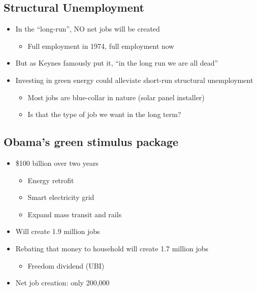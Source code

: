 \documentclass[
]{article}
\providecommand{\tightlist}{%
  \setlength{\itemsep}{0pt}\setlength{\parskip}{0pt}}
\begin{document}
\hypertarget{structural-unemployment}{%
\subsection{Structural Unemployment}\label{structural-unemployment}}

\begin{itemize}
\tightlist
\item
  In the ``long-run'', NO net jobs will be created

  \begin{itemize}
  \tightlist
  \item
    Full employment in 1974, full employment now
  \end{itemize}
\item
  But as Keynes famously put it, ``in the long run we are all dead''
\item
  Investing in green energy could alleviate short-run structural
  unemployment

  \begin{itemize}
  \tightlist
  \item
    Most jobs are blue-collar in nature (solar panel installer)
  \item
    Is that the type of job we want in the long term?
  \end{itemize}
\end{itemize}

\hypertarget{obamas-green-stimulus-package}{%
\subsection{Obama's green stimulus
package}\label{obamas-green-stimulus-package}}

\begin{itemize}
\tightlist
\item
  \$100 billion over two years

  \begin{itemize}
  \tightlist
  \item
    Energy retrofit
  \item
    Smart electricity grid
  \item
    Expand mass transit and rails
  \end{itemize}
\item
  Will create 1.9 million jobs
\item
  Rebating that money to household will create 1.7 million jobs

  \begin{itemize}
  \tightlist
  \item
    Freedom dividend (UBI)
  \end{itemize}
\item
  Net job creation: only 200,000
\end{itemize}
\end{document}
